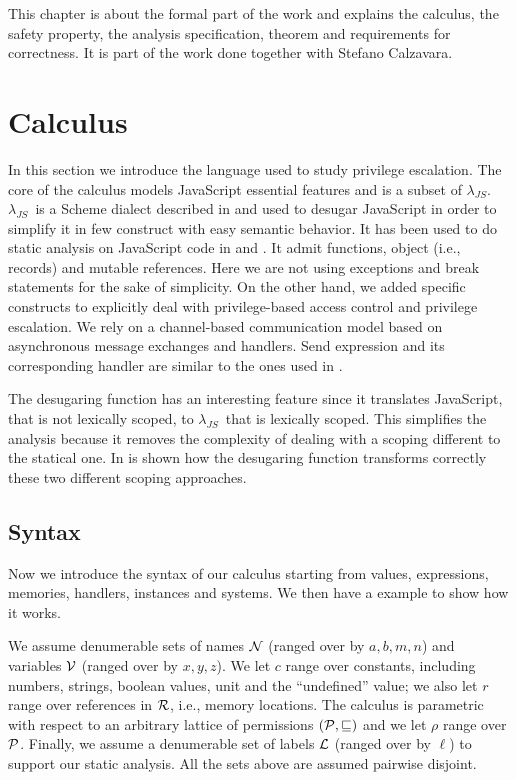 \newcommand{\ljs}{$\lambda_{JS}$}
This chapter is about the formal part of the work and explains the calculus, the safety property, the analysis specification, theorem and requirements for correctness. It is part of the work done together with Stefano Calzavara.

\section{Calculus}
\label{sec:Calculus}
In this section we introduce the language used to study privilege escalation. The core of the calculus models JavaScript essential features and is a subset of \ljs. \ljs\ is a Scheme dialect described in \cite{LambdaJS} and used to desugar JavaScript in order to simplify it in few construct with easy semantic behavior. It has been used to do static analysis on JavaScript code in \cite{Strobe} and \cite{LambdaJSMightVanHorn}. It admit functions, object (i.e., records) and mutable references. Here we are not using exceptions and break statements for the sake of simplicity. On the other hand, we added specific constructs to explicitly deal with privilege-based access control and privilege escalation. We rely on a channel-based communication model based on asynchronous message exchanges and handlers. Send expression and its corresponding handler are similar to the ones used in \cite{Lintent}. 

The desugaring function has an interesting feature since it translates JavaScript, that is not lexically scoped, to \ljs\ that is lexically scoped. This simplifies the analysis because it removes the complexity of dealing with a scoping different to the statical one. In \cite{LambdaJS} is shown how the desugaring function transforms correctly these two different scoping approaches.

\subsection{Syntax}
Now we introduce the syntax of our calculus starting from values, expressions, memories, handlers, instances and systems. We then have a example to show how it works.

We assume denumerable sets of names $\mathcal{N}$ (ranged over by $a,b,m,n$) and variables $\mathcal{V}$ (ranged over by $x,y,z$). We let $c$ range over constants, including numbers, strings, boolean values, unit and the ``undefined'' value; we also let $r$ range over references in $\mathcal{R}$, i.e., memory locations. The calculus is parametric with respect to an arbitrary lattice of permissions $(\mathcal{P},\sqsubseteq)$ and we let $\rho$ range over $\mathcal{P}$. Finally, we assume a denumerable set of labels ${\mathcal L}$ (ranged over by $\ell$) to support our static analysis. All the sets above are assumed pairwise disjoint.

